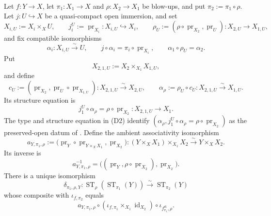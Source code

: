 \begin{lemma}
  \label{lemma:nagata-strict-transform-dominating}
  \lean{}

  Let $f\colon Y\to X$, let $\pi_1\colon X_1\to X$ and
  $\rho\colon X_2\to X_1$ be blow-ups, and put
  $\pi_2:=\pi_1\circ\rho$.  Let $j\colon U\hookrightarrow X$ be a
  quasi-compact open immersion, and set
  \[
    X_{i,U}:=X_i\times_XU,\qquad
    j_i^U:=\operatorname{pr}_{X_i}\colon X_{i,U}\hookrightarrow X_i,\qquad
    \rho_U:=(\rho\circ\operatorname{pr}_{X_2},\operatorname{pr}_U)
      \colon X_{2,U}\to X_{1,U},
  \]
  and fix compatible isomorphisms
  \[
    \alpha_i\colon X_{i,U}\xrightarrow{\sim}U,\qquad
    j\circ\alpha_i=\pi_i\circ\operatorname{pr}_{X_i},\qquad
    \alpha_1\circ\rho_U=\alpha_2.                                 \tag{D1}
  \]
  Put
  \[
    X_{2,1,U}:=X_2\times_{X_1}X_{1,U},
  \]
  and define
  \[
    c_U:=(\operatorname{pr}_{X_2},
      \operatorname{pr}_U\circ\operatorname{pr}_{X_{1,U}})
      \colon X_{2,1,U}\xrightarrow{\sim}X_{2,U},
    \qquad
    \alpha_\rho:=\rho_U\circ c_U
      \colon X_{2,1,U}\xrightarrow{\sim}X_{1,U}.                 \tag{D2}
  \]
  Its structure equation is
  \[
    j_1^U\circ\alpha_\rho
      =\rho\circ\operatorname{pr}_{X_2}\colon X_{2,1,U}\to X_1.
  \]
  The type and structure equation in (D2) identify
  $(\alpha_\rho,j_1^U\circ\alpha_\rho
    =\rho\circ\operatorname{pr}_{X_2})$
  as the preserved-open datum of
  .  Define the ambient associativity
  isomorphism
  \[
    a_{Y,\pi_1,\rho}:=
      \bigl(
        \operatorname{pr}_Y\circ\operatorname{pr}_{Y\times_XX_1},
        \operatorname{pr}_{X_2}
      \bigr)
      \colon (Y\times_XX_1)\times_{X_1}X_2
        \xrightarrow{\sim}Y\times_XX_2.                           \tag{D3}
  \]
  Its inverse is
  \[
    a_{Y,\pi_1,\rho}^{-1}
      =\bigl(
          (\operatorname{pr}_Y,\rho\circ\operatorname{pr}_{X_2}),
          \operatorname{pr}_{X_2}
        \bigr).
  \]
  There is a unique isomorphism
  \[
    \delta_{\pi_1,\rho,Y}\colon
      \operatorname{ST}_{\rho}(\operatorname{ST}_{\pi_1}(Y))
      \xrightarrow{\sim}\operatorname{ST}_{\pi_2}(Y)             \tag{D4}
  \]
  whose composite with $\iota_{f,\pi_2}$ equals
  \[
    a_{Y,\pi_1,\rho}\circ
      (\iota_{f,\pi_1}\times_{X_1}\operatorname{id}_{X_2})\circ
      \iota_{f^{\mathrm{st}}_{\pi_1},\rho}.                       \tag{D5}
  \]
\end{lemma}

